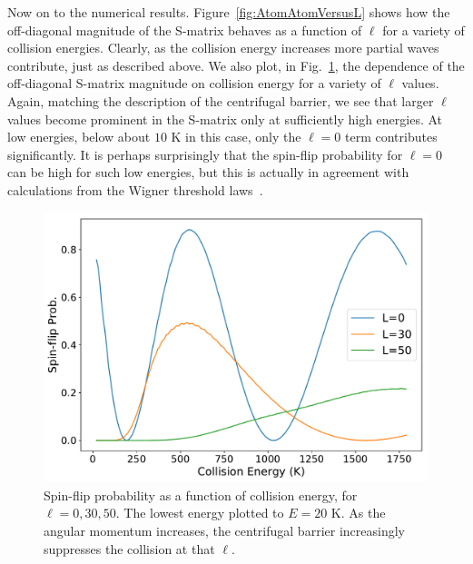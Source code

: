 \documentclass[%
 reprint,
 amsmath,amssymb,
 aps,
 nofootinbib
]{revtex4-1}
\begin{document}
Now on to the numerical results. Figure~\ref{fig:AtomAtomVersusL} shows how the off-diagonal magnitude of the S-matrix behaves as a function of $\ell$ for a variety of collision energies. Clearly, as the collision energy increases more partial waves contribute, just as described above. We also plot, in Fig.~\ref{fig:AtomAtomVersusE}, the dependence of the off-diagonal S-matrix magnitude on collision energy for a variety of $\ell$ values. Again, matching the description of the centrifugal barrier, we see that larger $\ell$ values become prominent in the S-matrix only at sufficiently high energies. At low energies, below about $10$ K in this case, only the $\ell=0$ term contributes significantly. It is perhaps surprisingly that the spin-flip probability for $\ell = 0$ can be high for such low energies, but this is actually in agreement with calculations from the Wigner threshold laws~\cite{Krems2017,ColdMolsBook}. 

\begin{figure}[t]
\includegraphics[width=1\columnwidth]{./Results/AtomAtomVersusE}
\caption{Spin-flip probability as a function of collision energy, for $\ell = 0, 30, 50$. The lowest energy plotted to $E = 20$ K. As the angular momentum increases, the centrifugal barrier increasingly suppresses the collision at that $\ell$.}
\label{fig:AtomAtomVersusE}
\end{figure}
\end{document}
